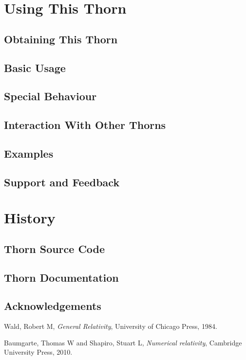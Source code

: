 \section{Using This Thorn}

\subsection{Obtaining This Thorn}

\subsection{Basic Usage}

\subsection{Special Behaviour}

\subsection{Interaction With Other Thorns}

\subsection{Examples}

\subsection{Support and Feedback}

\section{History}

\subsection{Thorn Source Code}

\subsection{Thorn Documentation}

\subsection{Acknowledgements}


\begin{thebibliography}{9}

  Wald, Robert M,
  \textit{General Relativity},
  University of Chicago Press,
  1984.

  Baumgarte, Thomas W and Shapiro, Stuart L,
  \textit{Numerical relativity},
  Cambridge University Press,
  2010.

\end{thebibliography}



